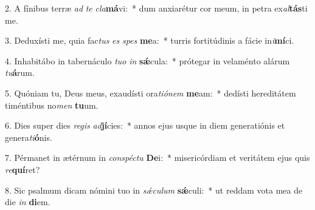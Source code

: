 2. A fínibus terræ \textit{ad} \textit{te} \textit{cla}\textbf{má}vi:~*  dum anxiarétur cor meum, in petra ex\textit{al}\textbf{tás}ti me.\

3. Deduxísti me, quia fac\textit{tus} \textit{es} \textit{spes} \textbf{me}a:~*  turris fortitúdinis a fácie in\textit{i}\textbf{mí}ci.\

4. Inhabitábo in tabernáculo \textit{tu}\textit{o} \textit{in} \textbf{sǽ}cula:~*  prótegar in velaménto alárum \textit{tu}\textbf{á}rum.\

5. Quóniam tu, Deus meus, exaudísti ora\textit{ti}\textit{ó}\textit{nem} \textbf{me}am:~*  dedísti hereditátem timéntibus no\textit{men} \textbf{tu}um.\

6. Dies super dies \textit{re}\textit{gis} \textit{ad}\textbf{jí}cies:~*  annos ejus usque in diem generatiónis et genera\textit{ti}\textbf{ó}nis.\

7. Pérmanet in ætérnum in \textit{con}\textit{spéc}\textit{tu} \textbf{De}i:~*  misericórdiam et veritátem ejus quis \textit{re}\textbf{quí}ret?\

8. Sic psalmum dicam nómini tuo in \textit{sǽ}\textit{cu}\textit{lum} \textbf{sǽ}culi:~*  ut reddam vota mea de die \textit{in} \textbf{di}em.\

